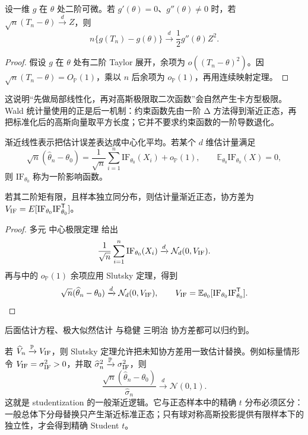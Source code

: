 \begin{corollary}
设一维 $g$ 在 $\theta$ 处二阶可微。若 $g'(\theta)=0$、$g''(\theta)\ne0$ 时，若 $\sqrt n(T_n-\theta)\xrightarrow{d} Z$，则
\[
 n\{g(T_n)-g(\theta)\}
 \xrightarrow{d}\frac12g''(\theta)Z^2.
\]
\end{corollary}
\begin{proof}
假设 $g$ 在 $\theta$ 处有二阶 Taylor 展开，余项为 $o((T_n-\theta)^2)$。因 $\sqrt n(T_n-\theta)=O_{\mathbb P}(1)$，乘以 $n$ 后余项为 $o_{\mathbb P}(1)$，再用连续映射定理。
\end{proof}
这说明“先做局部线性化，再对高斯极限取二次函数”会自然产生卡方型极限。Wald 统计量使用的正是后一机制：约束函数先由一阶 Δ 方法得到渐近正态，再把标准化后的高斯向量取平方长度；它并不要求约束函数的一阶导数退化。

\begin{definition}[渐近线性估计量与影响函数]
渐近线性表示把估计误差表达成中心化平均。若某个 $d$ 维估计量满足
\begin{equation}\label{eq:math-stat-asymptotically-linear}
 \sqrt n(\widehat\theta_n-\theta_0)
 =\frac1{\sqrt n}\sum_{i=1}^n\mathrm{IF}_{\theta_0}(X_i)
 +o_{\mathbb P}(1),
 \qquad
 \mathbb E_{\theta_0}\mathrm{IF}_{\theta_0}(X)=0,
\end{equation}
则 $\mathrm{IF}_{\theta_0}$ 称为一阶影响函数。
\end{definition}
\begin{proposition}[影响函数确定的渐近协方差]
若其二阶矩有限，且样本独立同分布，则估计量渐近正态，协方差为 $V_{\rm IF}=E[\mathrm{IF}_{\theta_0}\mathrm{IF}_{\theta_0}^{\mathsf T}]$。
\end{proposition}
\begin{proof}
多元 中心极限定理 给出
\[
 \frac1{\sqrt n}\sum_{i=1}^n\mathrm{IF}_{\theta_0}(X_i)
 \xrightarrow{d}\mathcal N_d(0,V_{\rm IF}).
\]
再与中的 $o_{\mathbb P}(1)$ 余项应用 Slutsky 定理，得到
\[
 \sqrt n(\widehat\theta_n-\theta_0)
 \xrightarrow{d}\mathcal N_d(0,V_{\rm IF}),
 \qquad
 V_{\rm IF}=\mathbb E_{\theta_0}[\mathrm{IF}_{\theta_0}\mathrm{IF}_{\theta_0}^{\mathsf T}].
\]
\end{proof}
后面估计方程、极大似然估计 与稳健 三明治 协方差都可以归约到。

若 $\widehat V_n\xrightarrow{\mathbb P} V_{\rm IF}$，则 Slutsky 定理允许把未知协方差用一致估计替换。例如标量情形令 $V_{\rm IF}=\sigma_{\rm IF}^2>0$，并取 $\widehat\sigma_n^2\xrightarrow{\mathbb P}\sigma_{\rm IF}^2$，则
\[
 \frac{\sqrt n(\widehat\theta_n-\theta_0)}{\widehat\sigma_n}
 \xrightarrow{d}\mathcal N(0,1).
\]
这就是 studentization 的一般渐近逻辑。它与正态样本中的精确 $t$ 分布必须区分：一般总体下分母替换只产生渐近标准正态；只有球对称高斯投影提供有限样本下的独立性，才会得到精确 Student $t$。


